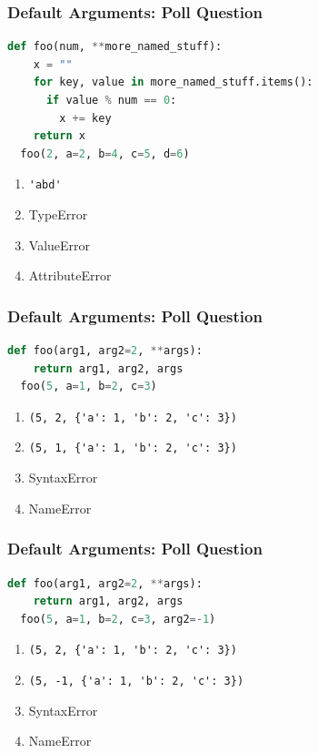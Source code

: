 \documentclass{beamer}
\begin{document}
%
%
\begin{frame}[fragile]
  \frametitle{Default Arguments: Poll Question}
  \begin{lstlisting}[language=Python, autogobble]
  def foo(num, **more_named_stuff):
    x = ""
    for key, value in more_named_stuff.items():
      if value % num == 0:
        x += key
    return x
  foo(2, a=2, b=4, c=5, d=6)
  \end{lstlisting}
  \vfill
  \begin{enumerate}[A]
    \item \lstinline|'abd'|
    \item TypeError
    \item ValueError
    \item AttributeError
  \end{enumerate}
\end{frame}

%
%
\begin{frame}[fragile]
  \frametitle{Default Arguments: Poll Question}
  \begin{lstlisting}[language=Python, autogobble]
  def foo(arg1, arg2=2, **args):
    return arg1, arg2, args
  foo(5, a=1, b=2, c=3)
  \end{lstlisting}
  \vfill
  \begin{enumerate}[A]
    \item \lstinline|(5, 2, {'a': 1, 'b': 2, 'c': 3})|
    \item \lstinline|(5, 1, {'a': 1, 'b': 2, 'c': 3})|
    \item SyntaxError
    \item NameError
  \end{enumerate}
\end{frame}

%
%
\begin{frame}[fragile]
  \frametitle{Default Arguments: Poll Question}
  \begin{lstlisting}[language=Python, autogobble]
  def foo(arg1, arg2=2, **args):
    return arg1, arg2, args
  foo(5, a=1, b=2, c=3, arg2=-1)
  \end{lstlisting}
  \vfill
  \begin{enumerate}[A]
    \item \lstinline|(5, 2, {'a': 1, 'b': 2, 'c': 3})|
    \item \lstinline|(5, -1, {'a': 1, 'b': 2, 'c': 3})|
    \item SyntaxError
    \item NameError
  \end{enumerate}
\end{frame}
\end{document}
